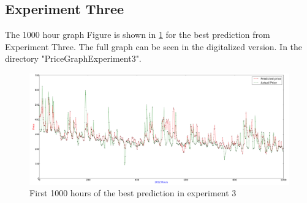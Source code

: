 \subsection{Experiment Three}
The 1000 hour graph Figure is shown in \ref{fig:fullPageExperiment3} for the best prediction from Experiment Three. The full graph can be seen in the digitalized version. In the directory "PriceGraphExperiment3".

\begin{figure}
\centering
\includegraphics[width=\linewidth]{billeder/PriceGraphs/Experiment3.png}
\caption{First 1000 hours of the best prediction in experiment 3}
\label{fig:fullPageExperiment3}
\end{figure}


